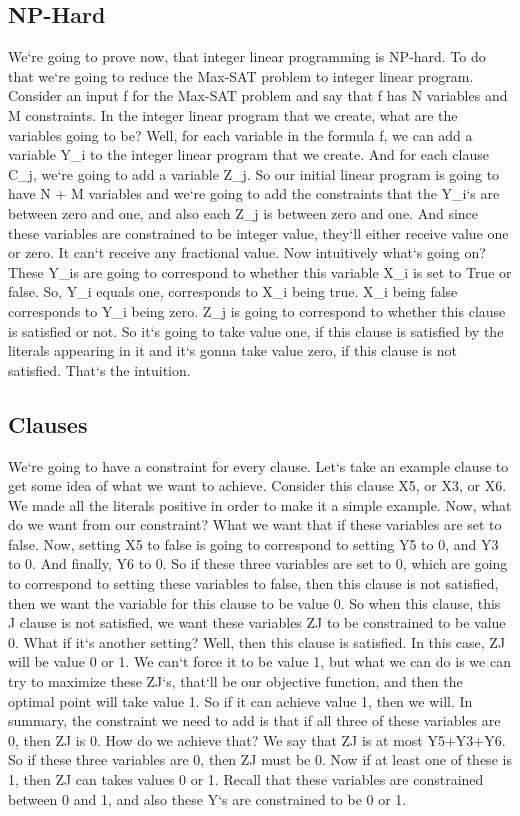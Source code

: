 \subsection{NP-Hard}
We`re going to prove now, that integer linear programming is NP-hard.
To do that we`re going to reduce the Max-SAT problem to integer linear program.
Consider an input f for the Max-SAT problem and say that f has N variables and M constraints.
In the integer linear program that we create, what are the variables going to be? Well, for each variable in the formula f, we can add a variable Y\_i to the integer linear program that we create.
And for each clause C\_j, we`re going to add a variable Z\_j.
So our initial linear program is going to have N + M variables and we`re going to add the constraints that the Y\_i`s are between zero and one, and also each Z\_j is between zero and one.
And since these variables are constrained to be integer value, they`ll either receive value one or zero.
It can`t receive any fractional value.
Now intuitively what`s going on? These Y\_is are going to correspond to whether this variable X\_i is set to True or false.
So, Y\_i equals one, corresponds to X\_i being true.
X\_i being false corresponds to Y\_i being zero.
Z\_j is going to correspond to whether this clause is satisfied or not.
So it`s going to take value one, if this clause is satisfied by the literals appearing in it and it`s gonna take value zero, if this clause is not satisfied.
That`s the intuition.

\subsection{Clauses}
We`re going to have a constraint for every clause.
Let`s take an example clause to get some idea of what we want to achieve.
Consider this clause X5, or X3, or X6.
We made all the literals positive in order to make it a simple example.
Now, what do we want from our constraint? What we want that if these variables are set to false.
Now, setting X5 to false is going to correspond to setting Y5 to 0, and Y3 to 0.
And finally, Y6 to 0.
So if these three variables are set to 0, which are going to correspond to setting these variables to false, then this clause is not satisfied, then we want the variable for this clause to be value 0.
So when this clause, this J clause is not satisfied, we want these variables ZJ to be constrained to be value 0.
What if it`s another setting? Well, then this clause is satisfied.
In this case, ZJ will be value 0 or 1.
We can`t force it to be value 1, but what we can do is we can try to maximize these ZJ`s, that`ll be our objective function, and then the optimal point will take value 1.
So if it can achieve value 1, then we will.
In summary, the constraint we need to add is that if all three of these variables are 0, then ZJ is 0.
How do we achieve that? We say that ZJ is at most Y5+Y3+Y6.
So if these three variables are 0, then ZJ must be 0.
Now if at least one of these is 1, then ZJ can takes values 0 or 1.
Recall that these variables are constrained between 0 and 1, and also these Y`s are constrained to be 0 or 1.


